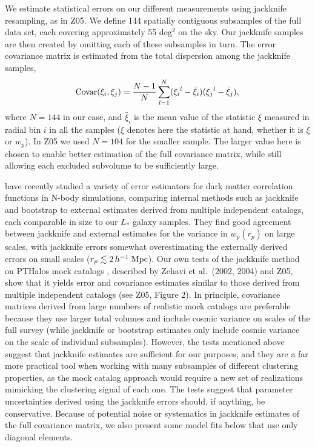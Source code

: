 \documentclass[]{emulateapj}
\newcommand{\hmpc}{\,h^{-1}\;{\rm Mpc}}
\newcommand{\wrp}{{w_p(r_p)}}
\begin{document}
We estimate statistical errors on our different measurements using 
jackknife resampling, as in Z05. 
We define 144 spatially contiguous subsamples of 
the full data set, each covering approximately 55 deg$^2$ on the sky. 
Our jackknife samples are  then created by omitting each of these subsamples 
in turn. The error covariance matrix is estimated from the total dispersion
among the jackknife samples, 
\begin{equation}
\label{eq:jk}
{\rm Covar}(\xi_i,\xi_j) = \frac{N-1}{N} \sum_{l=1}^{N} 
({\xi_i}^l - {\bar{\xi}_i})({\xi_j}^l - {\bar{\xi}_j}),
\end{equation}
where $N=144$ in our case, and $\bar{\xi}_i$ is the mean value of
the statistic ${\xi}$ measured in radial bin $i$ in all the samples
($\xi$ denotes here the statistic at hand, whether it is $\xi$ or $w_p$).
In Z05 we used $N=104$ for the smaller sample. The larger value here is
chosen to enable better estimation of the full covariance matrix, while
still allowing each excluded subvolume to be sufficiently large.

\citet{norberg09} have recently studied a variety of error estimators
for dark matter correlation functions in N-body simulations, comparing internal
methods such as jackknife and bootstrap to external estimates
derived from multiple independent catalogs, each comparable in
size to our $L_*$ galaxy samples.
They find good agreement
between jackknife and external estimates for the variance in $\wrp$
on large scales, with jackknife errors somewhat overestimating the
externally derived errors on small scales ($r_p \la 2\hmpc$).
Our own tests of the jackknife method on PTHalos 
mock catalogs \citep{scoccimarro02}, described by
Zehavi et al.\ (2002, 2004) and Z05, show that it yields error and
covariance estimates similar to those derived from multiple independent
catalogs (see Z05, Figure 2).
In principle, covariance matrices derived from large numbers of
realistic mock catalogs are preferable because they use larger
total volumes and include cosmic variance on scales of the full survey
(while jackknife or bootstrap estimates only include cosmic variance on 
the scale of individual subsamples).
However, the tests mentioned above suggest that jackknife estimates
are sufficient for our purposes, and they are a far more practical tool
when working with many subsamples of different clustering properties, 
as the mock catalog approach would require a new set of realizations
mimicking the clustering signal of each one.
The \cite{norberg09} tests suggest that parameter uncertainties
derived using the jackknife errors should, if anything,
be conservative.
Because of potential noise or systematics in jackknife
estimates of the full covariance matrix, we also present some
model fits below that use only diagonal elements.
\end{document}
